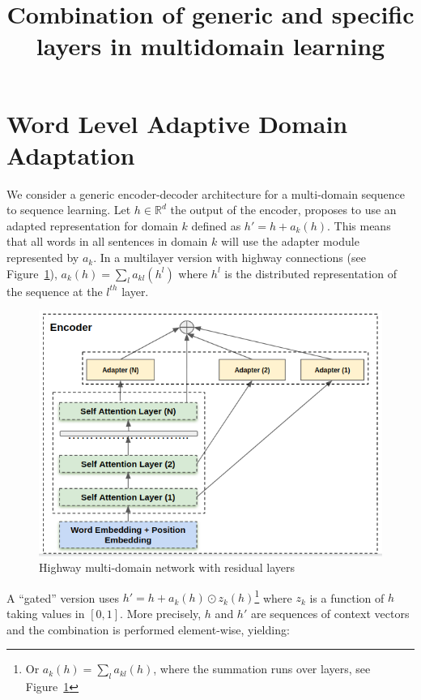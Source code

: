 \documentclass[12pt,times,a4paper,twoside]{article}
\title{Combination of generic and specific layers in multidomain learning}
\author{}
\date{}
\newcommand{\fyDone}[1]{\done[FY]\Todo[FY:]{\textcolor{orange}{#1}}}
\theoremstyle{definition}
\newcommand{\R}{\ensuremath{\mathbb{R}}}
\begin{document}
\maketitle
\begin{center}
{\LARGE \bf}\fyDone{Make a proper title}
\end{center}

\section*{Word Level Adaptive Domain Adaptation}
We consider a generic encoder-decoder architecture for a multi-domain sequence to sequence learning. Let $h \in \R^d$ the output of the encoder, \cite{} proposes to use an adapted representation for domain $k$ defined as $h' = h + a_k(h)$. This means that all words in all sentences in domain $k$ will use the adapter module represented by $a_k$. In a multilayer version with highway connections (see Figure~\ref{fig:hrl-architecture}), $a_k(h) = \sum_{l} a_{kl}(h^l)$ where $h^l$ is the distributed representation of the sequence at the $l^{th}$ layer.

\begin{figure}[h!]
  \centering
  \includegraphics[scale=0.5]{fig/highway_residual}
  \caption{Highway multi-domain network with residual layers}
\label{fig:hrl-architecture}
\end{figure}

 A ``gated'' version uses $h' = h + a_k(h) \odot{} z_k(h)$\footnote{Or $a_k(h) = \sum_{l} a_{kl}(h)$, where the summation runs over layers, see Figure~\ref{fig:hrl-architecture}} \fyDone{$a_k(h)=$ somme tous les composants résiduels} where $z_k$ is a function of $h$ taking values in $[0,1]$. More precisely, $h$ and $h'$ are sequences of context vectors and the combination is performed element-wise, yielding:\fyDone{pourquoi pas gating: $(1-a_k(h(w))*hh(w)$ ? Notation mult. component wise ?}
\end{document}
